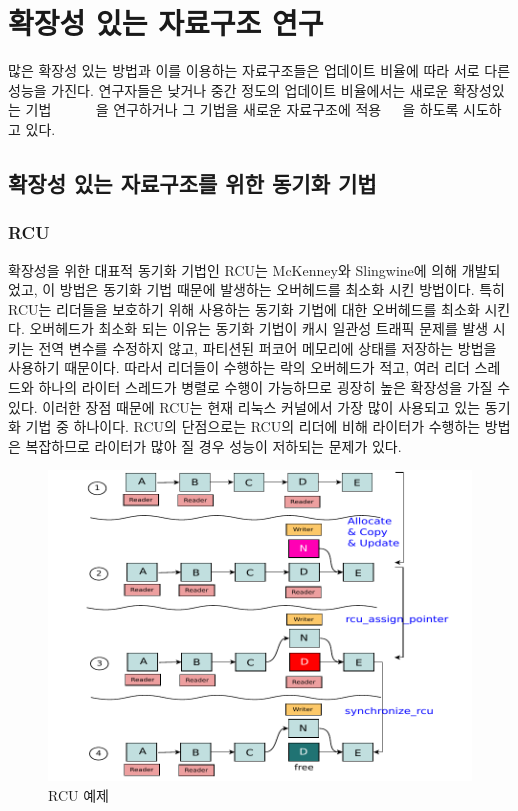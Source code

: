 \newpage
\section{확장성 있는 자료구조 연구}
\label{sec:datarelated}
많은 확장성 있는 방법과 이를 이용하는 자료구조들은 업데이트 비율에 따라 서로 다른 성능을 가진다.
연구자들은 낮거나 중간 정도의 업데이트 비율에서는 새로운 확장성있는
기법~\cite{McKenney98}~\cite{Matveev2015RLU}~\cite{Harris2001Lockfree} ~\cite{Fomitchev2004Lockfree}
~\cite{Timnat2012}을 연구하거나 그 기법을 새로운 자료구조에 
적용~\cite{Arbel2014ConcurrentRCU}~\cite{Dodds2015SCT}~\cite{AustinTClements2012RCUBalancedTrees}을
하도록 시도하고 있다.

\subsection{확장성 있는 자료구조를 위한 동기화 기법}

\subsubsection{RCU}
확장성을 위한 대표적 동기화 기법인 RCU는 McKenney와 Slingwine에 의해 개발되었고, 
이 방법은 동기화 기법 때문에 발생하는 오버헤드를 최소화 시킨 방법이다.
특히 RCU는 리더들을 보호하기 위해 사용하는 동기화 기법에 대한 오버헤드를 최소화 시킨다.
오버헤드가 최소화 되는 이유는 동기화 기법이 캐시 일관성 트래픽 문제를 발생 시키는 전역 변수를 수정하지 않고, 
파티션된 퍼코어 메모리에 상태를 저장하는 방법을 사용하기 때문이다.
따라서 리더들이 수행하는 락의 오버헤드가 적고, 여러 리더 스레드와
하나의 라이터 스레드가 병렬로 수행이 가능하므로 굉장히 높은 확장성을 가질 수 있다.
이러한 장점 때문에 RCU는 현재 리눅스 커널에서 가장 많이 사용되고 있는 동기화 기법 중 하나이다. 
RCU의 단점으로는 RCU의 리더에 비해 라이터가 수행하는 방법은 복잡하므로 라이터가 많아 질 경우 
성능이 저하되는 문제가 있다. 

\begin{figure}[h]
    \centering
    \includegraphics[width=1\textwidth]{fig/rcu/rcu_principle}
    \caption{RCU 예제}
  \label{fig:rcuprinciple}
\end{figure}

